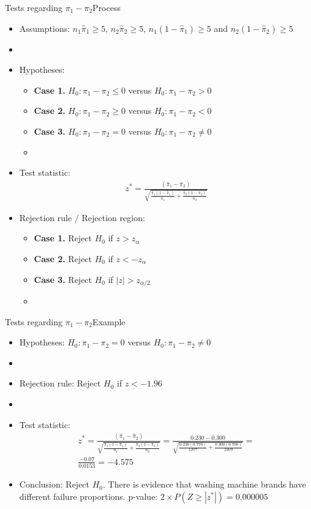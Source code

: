 \documentclass[xcolor=dvipsnames]{beamer}
\begin{document}
\begin{frame}{Tests regarding $\pi_1 - \pi_2$}{Process}
	\begin{itemize}
 \item Assumptions: $n_1 \hat{\pi}_1 \geq 5$, $n_2 \hat{\pi}_2 \geq 5$, $n_1 (1-\hat{\pi}_1) \geq 5$ and $n_2 (1-\hat{\pi}_2) \geq 5$
		\item[]
		\item Hypotheses:
		\begin{itemize}
			\item \textbf{Case 1.} $H_0: \pi_1-\pi_2 \leq 0$ versus $H_0: \pi_1-\pi_2 > 0$
			\item \textbf{Case 2.} $H_0: \pi_1-\pi_2 \geq 0$ versus $H_0: \pi_1-\pi_2 < 0$
			\item \textbf{Case 3.} $H_0: \pi_1-\pi_2 = 0$ versus $H_0: \pi_1-\pi_2 \neq 0$
			\item[]
		\end{itemize}
		
		\item Test statistic:
		\begin{gather*}
		z^*=\frac{(\hat{\pi}_1 - \hat{\pi}_2)}{\sqrt{\frac{\hat{\pi}_1 (1-\hat{\pi}_1)}{n_1}+\frac{\hat{\pi}_2 (1-\hat{\pi}_2)}{n_2}}}
		\end{gather*}
		\item Rejection rule / Rejection region: 
		\begin{itemize}
			\item \textbf{Case 1.} Reject $H_0$ if $z > z_{\alpha}$
			\item \textbf{Case 2.} Reject $H_0$ if $z < -z_{\alpha}$
			\item \textbf{Case 3.} Reject $H_0$ if $|z| > z_{\alpha / 2}$
			\item[]
		\end{itemize}
	\end{itemize}
\end{frame}

\begin{frame}{Tests regarding $\pi_1 - \pi_2$}{Example}
	\begin{itemize}
		\item Hypotheses: $H_0: \pi_1-\pi_2 = 0$ versus $H_0: \pi_1-\pi_2 \neq 0$
		\item[]
		\item Rejection rule: Reject $H_0$ if $z < -1.96$
		\item[]
		\item Test statistic:
		\begin{gather*}
			z^*=\frac{(\hat{\pi}_1 - \hat{\pi}_2)}{\sqrt{\frac{\hat{\pi}_1 (1-\hat{\pi}_1)}{n_1}+\frac{\hat{\pi}_2 (1-\hat{\pi}_2)}{n_2}}} = \frac{0.230 - 0.300}{\sqrt{\frac{0.230 (0.770)}{1207}+\frac{0.300 (0.700)}{2409}}} =  \\
			\frac{-0.07}{0.0153} = -4.575
		\end{gather*}
		\item Conclusion: Reject $H_0$. There is evidence that washing machine brands have different failure proportions. p-value: $2\times P(Z \geq |z^*|) =0.000005$ 
	\end{itemize}
\end{frame}
\end{document}
